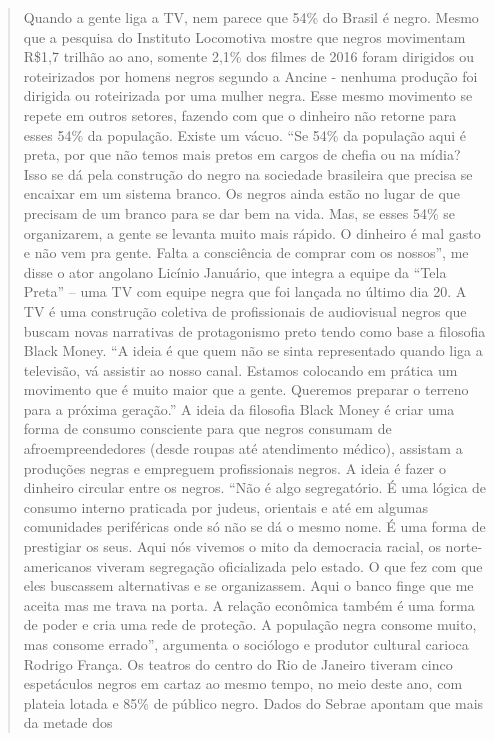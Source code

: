 \begin{quote}
Quando a gente liga a TV, nem parece que 54\% do Brasil é negro. Mesmo
que a pesquisa do Instituto Locomotiva mostre que negros movimentam
R\$1,7 trilhão ao ano, somente 2,1\% dos filmes de 2016 foram dirigidos
ou roteirizados por homens negros segundo a Ancine - nenhuma produção
foi dirigida ou roteirizada por uma mulher negra. Esse mesmo movimento
se repete em outros setores, fazendo com que o dinheiro não retorne para
esses 54\% da população. Existe um vácuo. ``Se 54\% da população aqui é
preta, por que não temos mais pretos em cargos de chefia ou na mídia?
Isso se dá pela construção do negro na sociedade brasileira que precisa
se encaixar em um sistema branco. Os negros ainda estão no lugar de que
precisam de um branco para se dar bem na vida. Mas, se esses 54\% se
organizarem, a gente se levanta muito mais rápido. O dinheiro é mal
gasto e não vem pra gente. Falta a consciência de comprar com os
nossos'', me disse o ator angolano Licínio Januário, que integra a
equipe da ``Tela Preta'' -- uma TV com equipe negra que foi lançada no
último dia 20. A TV é uma construção coletiva de profissionais de
audiovisual negros que buscam novas narrativas de protagonismo preto
tendo como base a filosofia Black Money. ``A ideia é que quem não se
sinta representado quando liga a televisão, vá assistir ao nosso canal.
Estamos colocando em prática um movimento que é muito maior que a gente.
Queremos preparar o terreno para a próxima geração.'' A ideia da
filosofia Black Money é criar uma forma de consumo consciente para que
negros consumam de afroempreendedores (desde roupas até atendimento
médico), assistam a produções negras e empreguem profissionais negros. A
ideia é fazer o dinheiro circular entre os negros. ``Não é algo
segregatório. É uma lógica de consumo interno praticada por judeus,
orientais e até em algumas comunidades periféricas onde só não se dá o
mesmo nome. É uma forma de prestigiar os seus. Aqui nós vivemos o mito
da democracia racial, os norte-americanos viveram segregação
oficializada pelo estado. O que fez com que eles buscassem alternativas
e se organizassem. Aqui o banco finge que me aceita mas me trava na
porta. A relação econômica também é uma forma de poder e cria uma rede
de proteção. A população negra consome muito, mas consome errado'',
argumenta o sociólogo e produtor cultural carioca Rodrigo França. Os
teatros do centro do Rio de Janeiro tiveram cinco espetáculos negros em
cartaz ao mesmo tempo, no meio deste ano, com plateia lotada e 85\% de
público negro. Dados do Sebrae apontam que mais da metade dos

\end{quote}

